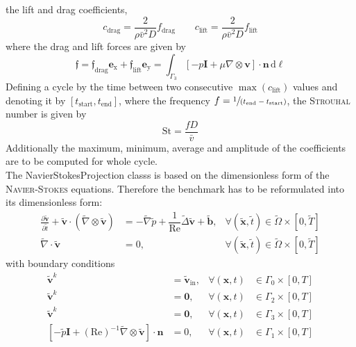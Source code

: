 \documentclass[]{scrartcl}
\newcommand{\pfrac}[2]{\frac{\partial #1}{\partial #2}}
\renewcommand{\d}{\,\mathrm{d}}
\newcommand{\bs}[1]{\boldsymbol{#1}}
\begin{document}
the lift and drag coefficients,
\begin{equation*}
	c_\textrm{drag} = \dfrac{2}{\rho\bar{v}^2D} f_\textrm{drag}
	\qquad
	c_\textrm{lift} = \dfrac{2}{\rho\bar{v}^2D} f_\textrm{lift}
\end{equation*}
where the drag and lift forces are given by
\begin{equation*}
	 \bs{\mathfrak{f}} = \mathfrak{f}_\textrm{drag}  \bs{e}_\textrm{x} +  \mathfrak{f}_\textrm{lift} \bs{e}_\textrm{y} =
	 \int_{\Gamma_3} [-p\bs{I} + \mu \nabla \otimes \bs{v}] \cdot \bs{n} \d \ell
\end{equation*}
Defining a cycle by the time between two consecutive $\max(c_\textrm{lift})$ values and denoting it by $[t_\textrm{start}, t_\textrm{end}]$, where the frequency $f = \sfrac{1}{(t_\textrm{end} - t_\textrm{start})}$, the \textsc{Strouhal} number is given by
\begin{equation*}
	\textrm{St} = \dfrac{fD}{\bar{v}}
\end{equation*}
Additionally the maximum, minimum, average and amplitude of the coefficients are to be computed for whole cycle.
\\
The NavierStokesProjection classs is based on the dimensionless form of the \textsc{Navier-Stokes} equations. Therefore the benchmark has to be reformulated into its dimensionless form:
\begin{equation*}
	\begin{aligned}
		\pfrac{\bs{\tilde{v}}}{\tilde{t}} + \bs{\tilde{v}} \cdot (\tilde{\nabla} \otimes \bs{\tilde{v}})&=  -\tilde{\nabla} \tilde{p}+ \dfrac{1}{\mathrm{Re}}\tilde{\Delta} \bs{\tilde{v}} + \bs{\tilde{b}}, &\forall (\bs{\tilde{x}}, \tilde{t}) \in \tilde{\Omega} \times [0, \tilde{T} ] \\
		\tilde{\nabla} \cdot \bs{\tilde{v}}&= 0, &\forall (\bs{\tilde{x}}, \tilde{t}) \in\tilde{ \Omega} \times  [0, \tilde{T} ]
	\end{aligned}
\end{equation*}
with boundary conditions
\begin{equation*}
	\begin{aligned}
		\bs{\tilde{v}}^{k} &= \bs{\tilde{v}}_\textrm{in},  &\forall(\bs{x}, t) &\in \Gamma_0 \times [0, T] \\
		\bs{\tilde{v}}^{k} &= \bs{0}, &\forall(\bs{x}, t) &\in \Gamma_2 \times [0,T]\\
		\bs{\tilde{v}}^{k} &= \bs{0}, &\forall(\bs{x}, t) &\in \Gamma_3 \times [0, T] \\
		[-\tilde{p}\bs{I} + (\textrm{Re})^{-1}\tilde{ \nabla} \otimes \bs{\tilde{v}}] \cdot \bs{n} &=0, &\forall(\bs{x}, t) &\in \Gamma_1 \times [0, T] \\
	\end{aligned}
\end{equation*}
\end{document}
